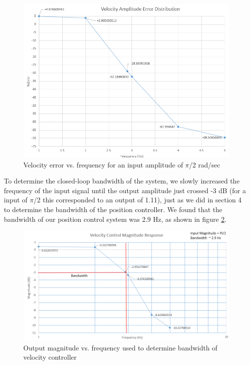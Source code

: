 \documentclass{article}
\theoremstyle{plain}
\theoremstyle{definition}
\theoremstyle{remark}
\begin{document}
\begin{figure}[htb]
\begin{center}
\includegraphics[width = 14cm]{VelocityControl_Error.png}
\caption{Velocity error vs. frequency for an input amplitude of $\pi$/2 rad/sec}
\label{VelFreqError}
\end{center}
\end{figure}

To determine the closed-loop bandwidth of the system, we slowly increased the frequency of the input signal until the output amplitude just crossed -3 dB (for a input of $\pi$/2 this corresponded to an output of 1.11), just as we did in section 4 to determine the bandwidth of the position controller. We found that the bandwidth of our position control system was  2.9 Hz, as shown in figure \ref{VelBandwidth}.

\begin{figure}[htb]
\begin{center}
\includegraphics[width = 14cm]{VelocityControl_Magnitude.png}
\caption{Output magnitude vs. frequency used to determine bandwidth of velocity controller}
\label{VelBandwidth}
\end{center}
\end{figure}
\end{document}
